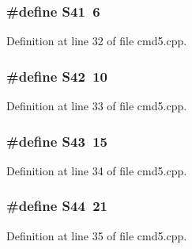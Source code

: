 \subsubsection[{S41}]{\setlength{\rightskip}{0pt plus 5cm}\#define S41~6}\label{cmd5_8cpp_ab674ba129e588da55d1d494e1cf3c15e}


Definition at line 32 of file cmd5.\-cpp.

\subsubsection[{S42}]{\setlength{\rightskip}{0pt plus 5cm}\#define S42~10}\label{cmd5_8cpp_a268ef1a49114a94b931cc6b313e3cd1b}


Definition at line 33 of file cmd5.\-cpp.

\subsubsection[{S43}]{\setlength{\rightskip}{0pt plus 5cm}\#define S43~15}\label{cmd5_8cpp_a5aaa7121f39650d472746942ca68f959}


Definition at line 34 of file cmd5.\-cpp.

\subsubsection[{S44}]{\setlength{\rightskip}{0pt plus 5cm}\#define S44~21}\label{cmd5_8cpp_a6a3989af72b55d169bd73a66f8620aae}


Definition at line 35 of file cmd5.\-cpp.

